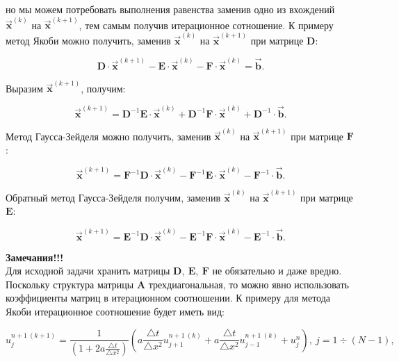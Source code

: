 \documentclass[12pt,a4paper]{article}
\begin{document}
		но мы можем потребовать выполнения равенства заменив одно из вхождений $\vec{\mathbf{x}}^{(k)}$ на $\vec{\mathbf{x}}^{(k+1)}$, тем самым получив итерационное сотношение. К примеру метод Якоби можно получить, заменив $\vec{\mathbf{x}}^{(k)}$ на $\vec{\mathbf{x}}^{(k+1)}$ при матрице $\mathbf{D}$:

		\begin{equation}
			\mathbf{D} \cdot \vec{\mathbf{x}}^{(k+1)} - \mathbf{E} \cdot \vec{\mathbf{x}}^{(k)} - \mathbf{F} \cdot \vec{\mathbf{x}}^{(k)} = \vec{\mathbf{b}}.
		\end{equation}

		Выразим $\vec{\mathbf{x}}^{(k+1)}$, получим:

		\begin{equation}
			\vec{\mathbf{x}}^{(k+1)} = \mathbf{D}^{-1} \mathbf{E} \cdot \vec{\mathbf{x}}^{(k)} + \mathbf{D}^{-1} \mathbf{F} \cdot \vec{\mathbf{x}}^{(k)} + \mathbf{D}^{-1} \cdot \vec{\mathbf{b}}.
		\end{equation}

		Метод Гаусса-Зейделя можно получить, заменив $\vec{\mathbf{x}}^{(k)}$ на $\vec{\mathbf{x}}^{(k+1)}$ при матрице $\mathbf{F}$:

		\begin{equation}
			\vec{\mathbf{x}}^{(k+1)} = \mathbf{F}^{-1} \mathbf{D} \cdot \vec{\mathbf{x}}^{(k)} - \mathbf{F}^{-1} \mathbf{E} \cdot \vec{\mathbf{x}}^{(k)} - \mathbf{F}^{-1} \cdot \vec{\mathbf{b}}.
		\end{equation}

		Обратный метод Гаусса-Зейделя получим, заменив $\vec{\mathbf{x}}^{(k)}$ на $\vec{\mathbf{x}}^{(k+1)}$ при матрице $\mathbf{E}$:

		\begin{equation}
			\vec{\mathbf{x}}^{(k+1)} = \mathbf{E}^{-1} \mathbf{D} \cdot \vec{\mathbf{x}}^{(k)} - \mathbf{E}^{-1} \mathbf{F} \cdot \vec{\mathbf{x}}^{(k)} - \mathbf{E}^{-1} \cdot \vec{\mathbf{b}}.
		\end{equation}

		\textbf{\large Замечания!!!}\\

		Для исходной задачи хранить матрицы $\mathbf{D}, \: \mathbf{E}, \: \mathbf{F}$ не обязательно и даже вредно. Поскольку структура матрицы $\mathbf{A}$ трехдиагональная, то можно явно использовать коэффициенты матриц в итерационном соотношении. К примеру для метода Якоби итерационное соотношение будет иметь вид:

		\begin{equation}
			u^{n+1 \: (k+1)}_{j} = \frac{1}{\left( 1 + 2 a \frac{\triangle t}{\triangle x^{2}} \right)} \left( a \frac{\triangle t}{\triangle x^{2}} u^{n+1 \: (k)}_{j+1} + a \frac{\triangle t}{\triangle x^{2}} u^{n+1 \: (k)}_{j-1} + u^{n}_{j} \right), \: j = 1 \div (N - 1),
		\end{equation}
\end{document}
